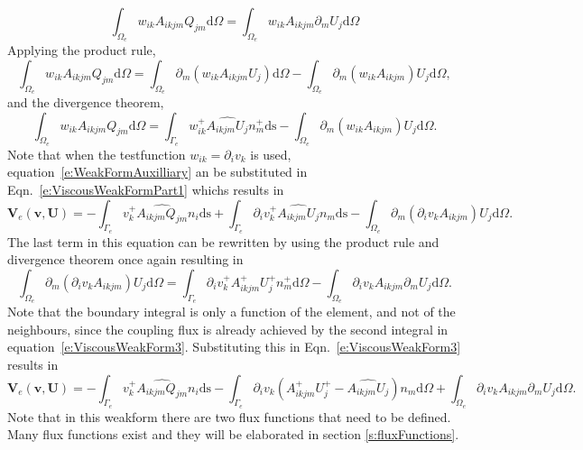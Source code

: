 \documentclass{report}
\begin{document}
\begin{equation}
\int_{\Omega_e} w_{ik} A_{ikjm} Q_{jm} \mathrm{d}\Omega 
= \int_{\Omega_e} w_{ik} A_{ikjm} \partial_m U_j \mathrm{d}\Omega
\end{equation}
Applying the product rule,
\begin{equation}
\int_{\Omega_e} w_{ik} A_{ikjm} Q_{jm} \mathrm{d}\Omega 
= \int_{\Omega_e} \partial_m ({w_{ik} A_{ikjm} U_j}) \mathrm{d}\Omega
- \int_{\Omega_e} \partial_m (w_{ik} A_{ikjm}) U_j \mathrm{d}\Omega,
\end{equation}
and the divergence theorem,
\begin{equation}
\label{e:WeakFormAuxilliary}
\int_{\Omega_e} w_{ik} A_{ikjm} Q_{jm} \mathrm{d}\Omega 
= \int_{\Gamma_e} {w_{ik}^+ \widehat{A_{ikjm} U_j}} n_m^+ \mathrm{ds}
- \int_{\Omega_e} \partial_m (w_{ik} A_{ikjm}) U_j \mathrm{d}\Omega.
\end{equation}
Note that when the testfunction $w_{ik} = \partial_i v_k$ is used, equation~\ref{e:WeakFormAuxilliary} an be substituted in Eqn.~\ref{e:ViscousWeakFormPart1} whichs results in
\begin{equation}
\label{e:ViscousWeakForm3}
\mathbf{V}_e(\mathbf{v},\mathbf{U}) = 
- \int_{\Gamma_e} v_k^{+} \widehat{{{A}_{ikjm} Q_{jm}}} n_i \mathrm{ds}
+ \int_{\Gamma_e} {\partial_i v_k^+ \widehat{A_{ikjm} U_j}} n_m \mathrm{ds}
- \int_{\Omega_e} \partial_m (\partial_i v_k A_{ikjm}) U_j \mathrm{d}\Omega.
\end{equation}
The last term in this equation can be rewritten by using the product rule and divergence theorem once again resulting in
\begin{equation}
\int_{\Omega_e} \partial_m (\partial_i v_k A_{ikjm}) U_j \mathrm{d}\Omega
=  \int_{\Gamma_e} \partial_i v_k^+ A_{ikjm}^+ U_j^+ n_m^+ \mathrm{d}\Omega
- \int_{\Omega_e} \partial_i v_k A_{ikjm} \partial_m U_j \mathrm{d}\Omega.
\end{equation}
Note that the boundary integral is only a function of the element, and not of the neighbours, since the coupling flux is already achieved by the second integral in equation~\ref{e:ViscousWeakForm3}. Substituting this in Eqn.~\ref{e:ViscousWeakForm3} results in
\begin{equation}
\mathbf{V}_e(\mathbf{v},\mathbf{U}) = 
- \int_{\Gamma_e} v_k^{+} \widehat{{{A}_{ikjm} Q_{jm}}} n_i \mathrm{ds}
- \int_{\Gamma_e} \partial_i v_k (A_{ikjm}^+ U_j^{+} - \widehat{A_{ikjm} U_j})n_m \mathrm{d}\Omega
+ \int_{\Omega_e} \partial_i v_k A_{ikjm} \partial_m U_j \mathrm{d}\Omega.
\end{equation}
Note that in this weakform there are two flux functions that need to be defined. Many flux functions exist and they will be elaborated in section \ref{s:fluxFunctions}.
\end{document}
